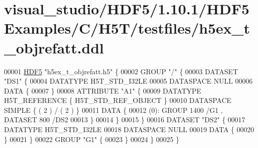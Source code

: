 \hypertarget{visual__studio_2_h_d_f5_21_810_81_2_h_d_f5_examples_2_c_2_h5_t_2testfiles_2h5ex__t__objrefatt_8ddl_source}{}\section{visual\+\_\+studio/\+H\+D\+F5/1.10.1/\+H\+D\+F5\+Examples/\+C/\+H5\+T/testfiles/h5ex\+\_\+t\+\_\+objrefatt.ddl}
\label{visual__studio_2_h_d_f5_21_810_81_2_h_d_f5_examples_2_c_2_h5_t_2testfiles_2h5ex__t__objrefatt_8ddl_source}

\begin{DoxyCode}
00001 \hyperlink{namespace_h_d_f5}{HDF5} \textcolor{stringliteral}{"h5ex\_t\_objrefatt.h5"} \{
00002 GROUP \textcolor{stringliteral}{"/"} \{
00003    DATASET \textcolor{stringliteral}{"DS1"} \{
00004       DATATYPE  H5T\_STD\_I32LE
00005       DATASPACE  NULL
00006       DATA \{
00007       \}
00008       ATTRIBUTE \textcolor{stringliteral}{"A1"} \{
00009          DATATYPE  H5T\_REFERENCE \{ H5T\_STD\_REF\_OBJECT \}
00010          DATASPACE  SIMPLE \{ ( 2 ) / ( 2 ) \}
00011          DATA \{
00012          (0): GROUP 1400 /G1 , DATASET 800 /DS2 
00013          \}
00014       \}
00015    \}
00016    DATASET \textcolor{stringliteral}{"DS2"} \{
00017       DATATYPE  H5T\_STD\_I32LE
00018       DATASPACE  NULL
00019       DATA \{
00020       \}
00021    \}
00022    GROUP \textcolor{stringliteral}{"G1"} \{
00023    \}
00024 \}
00025 \}
\end{DoxyCode}
